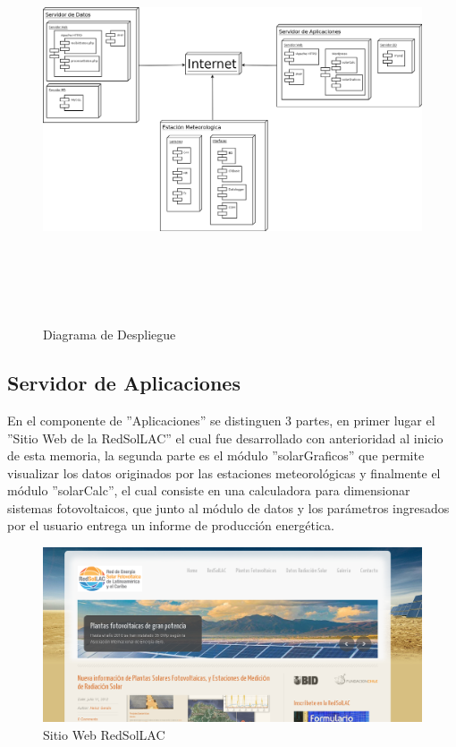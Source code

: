 \begin{figure}[h!]
        \centering
        \includegraphics[width=15cm,height=12cm]{images/despliegue}
        \caption{Diagrama de Despliegue}
	\label{diagramaDespliegue}
\end{figure}

\subsection{Servidor de Aplicaciones}
En el componente de ''Aplicaciones'' se distinguen 3 partes, en primer lugar el ''Sitio Web de la RedSolLAC'' el cual fue desarrollado con anterioridad al inicio de esta memoria, la segunda parte es el módulo ''solarGraficos'' que permite visualizar los datos originados por las estaciones meteorológicas y finalmente el módulo ''solarCalc'', el cual consiste en una calculadora para dimensionar sistemas fotovoltaicos, que junto al módulo de datos y los parámetros ingresados por el usuario entrega un informe de producción energética.

\begin{figure}[h!]
        \centering
        \includegraphics[scale=0.3]{images/webRedSolLAC}
        \caption{Sitio Web RedSolLAC}
        \label{webRed}
\end{figure}


